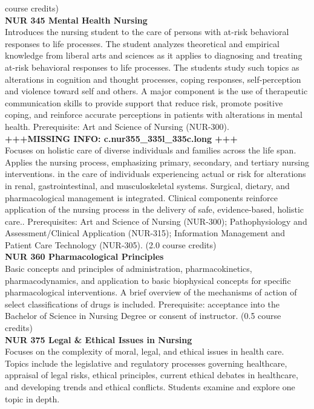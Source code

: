\documentclass[
  letterpaper,
]{scrbook}
\begin{document}
course credits)\\
\textbf{NUR 345 Mental Health Nursing}\\
Introduces the nursing student to the care of persons with at-risk
behavioral responses to life processes. The student analyzes theoretical
and empirical knowledge from liberal arts and sciences as it applies to
diagnosing and treating at-risk behavioral responses to life processes.
The students study such topics as alterations in cognition and thought
processes, coping responses, self-perception and violence toward self
and others. A major component is the use of therapeutic communication
skills to provide support that reduce risk, promote positive coping, and
reinforce accurate perceptions in patients with alterations in mental
health. Prerequisite: Art and Science of Nursing (NUR-300).\\
\textbf{+++MISSING INFO: c.nur355\_335l\_335c.long +++}\\
Focuses on holistic care of diverse individuals and families across the
life span. Applies the nursing process, emphasizing primary, secondary,
and tertiary nursing interventions. in the care of individuals
experiencing actual or risk for alterations in renal, gastrointestinal,
and musculoskeletal systems. Surgical, dietary, and pharmacological
management is integrated. Clinical components reinforce application of
the nursing process in the delivery of safe, evidence-based, holistic
care.. Prerequisites: Art and Science of Nursing (NUR-300);
Pathophysiology and Assessment/Clinical Application (NUR-315);
Information Management and Patient Care Technology (NUR-305). (2.0
course credits)\\
\textbf{NUR 360 Pharmacological Principles}\\
Basic concepts and principles of administration, pharmacokinetics,
pharmacodynamics, and application to basic biophysical concepts for
specific pharmacological interventions. A brief overview of the
mechanisms of action of select classifications of drugs is included.
Prerequisite: acceptance into the Bachelor of Science in Nursing Degree
or consent of instructor. (0.5 course credits)\\
\textbf{NUR 375 Legal \& Ethical Issues in Nursing}\\
Focuses on the complexity of moral, legal, and ethical issues in health
care. Topics include the legislative and regulatory processes governing
healthcare, appraisal of legal risks, ethical principles, current
ethical debates in healthcare, and developing trends and ethical
conflicts. Students examine and explore one topic in depth.
\end{document}
